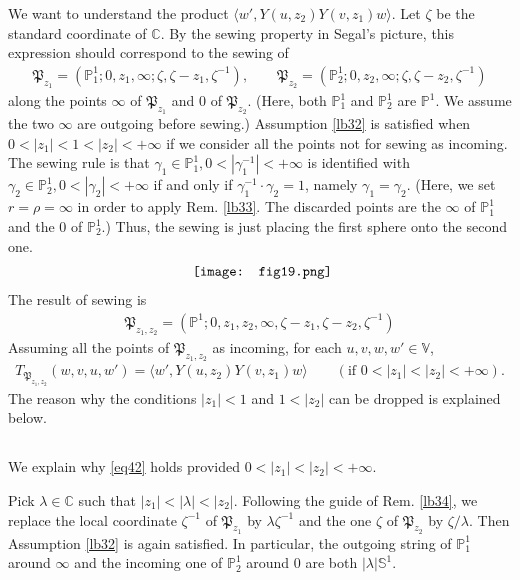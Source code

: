 \documentclass[12pt,a4paper,notitlepage]{article}
\theoremstyle{definition}
\theoremstyle{plain}
\newcommand{\fk}{\mathfrak}
\newcommand{\bk}[1]{\langle {#1}\rangle}
\newcommand{\Vbb}{\mathbb V}
\newcommand{\Cbb}{\mathbb C}
\newcommand{\Pbb}{\mathbb P}
\newcommand{\Sbb}{{\mathbb S}}
\numberwithin{equation}{section}
\begin{document}
We want to understand the product $\bk{w',Y(u,z_2)Y(v,z_1)w}$. Let $\zeta$ be the standard coordinate of $\Cbb$. By the sewing property in Segal's picture, this expression should correspond to the sewing of
\begin{gather*}
\fk P_{z_1}=(\Pbb^1_1;0,z_1,\infty;\zeta,\zeta-z_1,\zeta^{-1}),\qquad \fk P_{z_2}=(\Pbb^1_2;0,z_2,\infty;\zeta,\zeta-z_2,\zeta^{-1})	
\end{gather*}
along the points $\infty$ of $\fk P_{z_1}$ and $0$ of $\fk P_{z_2}$. (Here, both $\Pbb^1_1$ and $\Pbb^1_2$ are $\Pbb^1$. We assume the two $\infty$ are outgoing before sewing.) Assumption \ref{lb32} is satisfied when $0<|z_1|<1<|z_2|<+\infty$ if we consider all the points not for sewing as incoming. The sewing rule is that $\gamma_1\in\Pbb^1_1,0<|\gamma_1^{-1}|<+\infty$ is identified with $\gamma_2\in\Pbb^1_2,0<|\gamma_2|<+\infty$  if and only if  $\gamma_1^{-1}\cdot \gamma_2=1$, namely $\gamma_1=\gamma_2$. (Here, we set $r=\rho=\infty$ in order to apply Rem. \ref{lb33}. The discarded points are the $\infty$ of $\Pbb^1_1$ and the $0$ of $\Pbb^1_2$.) Thus, the sewing is just placing the first sphere onto the second one. 
\begin{align*}
\vcenter{\hbox{{
\texttt{[image: fig19.png]}}}}
\end{align*}
The result of sewing is
\begin{gather}
\fk P_{z_1,z_2}=(\Pbb^1;0,z_1,z_2,\infty,\zeta-z_1,\zeta-z_2,\zeta^{-1})\label{eq61}	
\end{gather}
Assuming all the points of $\fk P_{z_1,z_2}$ as incoming,  for each $u,v,w,w'\in\Vbb$,
\begin{align}
T_{\fk P_{z_1,z_2}}(w,v,u,w')=\bk{w',Y(u,z_2)Y(v,z_1)w}\qquad(\text{if }0<|z_1|<|z_2|<+\infty).\label{eq42}	
\end{align}
The reason why the conditions $|z_1|<1$ and $1<|z_2|$ can be dropped is explained below.



\subsection{}\label{lb185}

We explain why \eqref{eq42} holds provided  $0<|z_1|<|z_2|<+\infty$.

Pick $\lambda\in\Cbb$ such that $|z_1|<|\lambda|<|z_2|$. Following the guide of Rem. \ref{lb34}, we replace the local coordinate $\zeta^{-1}$ of $\fk P_{z_1}$ by $\lambda\zeta^{-1}$ and the one $\zeta$ of $\fk P_{z_2}$ by $\zeta/\lambda$. Then Assumption \ref{lb32} is again satisfied. In particular, the outgoing string of $\Pbb^1_1$ around $\infty$ and the incoming one of $\Pbb^1_2$ around $0$ are both $|\lambda|\Sbb^1$.
\end{document}
